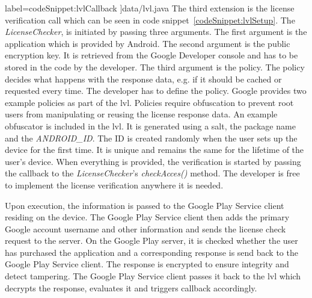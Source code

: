   label={codeSnippet:lvlCallback}
]{data/lvl.java}
The third extension is the license verification call which can be seen in code snippet~\ref{codeSnippet:lvlSetup}.
The \textit{LicenseChecker}, is initiated by passing three arguments.
The first argument is the application which is provided by Android.
The second argument is the public encryption key.
It is retrieved from the Google Developer console and has to be stored in the code by the developer.
\newline
The third argument is the policy.
The policy decides what happens with the response data, e.g. if it should be cached or requested every time.
The developer has to define the policy.
Google provides two example policies as part of the \gls{lvl}.
Policies require obfuscation to prevent root users from manipulating or reusing the license response data.
An example obfuscator is included in the \gls{lvl}.
It is generated using a salt, the package name and the \textit{ANDROID\_ID}.
The ID is created randomly when the user sets up the device for the first time.
It is unique and remains the same for the lifetime of the user's device.
\newline
When everything is provided, the verification is started by passing the callback to the \textit{LicenseChecker}'s \textit{checkAcces()} method.
The developer is free to implement the license verification anywhere it is needed.
\cite{developersLicensingOverview} \cite{developersLicensingSetup} \cite{developersLicensingAdding} \cite{digipomLvl}
\newline

Upon execution, the information is passed to the Google Play Service client residing on the device.
The Google Play Service client then adds the primary Google account username and other information and sends the license check request to the server.
On the Google Play server, it is checked whether the user has purchased the application and a corresponding response is send back to the Google Play Service client.
The response is encrypted to ensure integrity and detect tampering.
The Google Play Service client passes it back to the \gls{lvl} which decrypts the response, evaluates it and triggers callback accordingly. \cite{developersLicensingOverview} \cite{developersLicensingSetup} \cite{developersLicensingAdding} \cite{digipomLvl}
